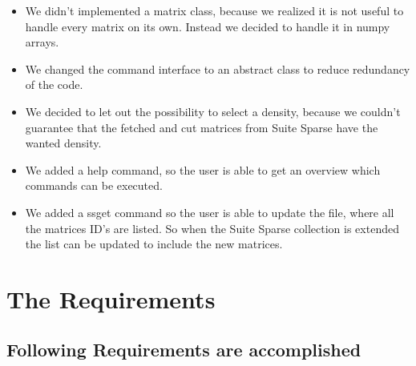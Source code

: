 \documentclass[parskip=full]{scrartcl}
\begin{document}
\begin{itemize}

\item We didn't implemented a matrix class, because we realized it is not useful to handle every matrix on its own. 
Instead we decided to handle it in numpy arrays.

\item We changed the command interface to an abstract class to reduce redundancy of the code.

\item We decided to let out the possibility to select a density, because we couldn't guarantee that the fetched and cut matrices from Suite Sparse have the wanted density.

\item We added a help command, so the user is able to get an overview which commands can be executed.

\item We added a \gls{ssget} command so the user is able to update the file, where all the matrices ID's are listed.
So when the Suite Sparse collection is extended the list can be updated to include the new matrices. 

\end{itemize}



\section{The Requirements}
\subsection{Following Requirements are accomplished}
\end{document}
